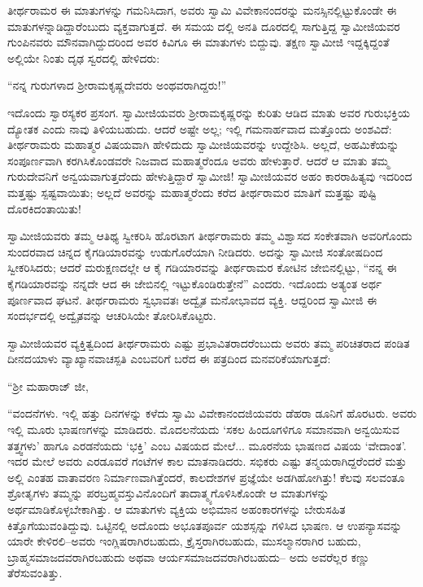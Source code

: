 ತೀರ್ಥರಾಮರ ಈ ಮಾತುಗಳನ್ನು ಗಮನಿಸಿದಾಗ, ಅವರು ಸ್ವಾಮಿ ವಿವೇಕಾನಂದರನ್ನು ಮನಸ್ಸಿನಲ್ಲಿಟ್ಟುಕೊಂಡೇ ಈ ಮಾತುಗಳನ್ನಾಡಿದ್ದಾರೆಂಬುದು ವ್ಯಕ್ತವಾಗುತ್ತದೆ. ಈ ಸಮಯ ದಲ್ಲಿ ಅನತಿ ದೂರದಲ್ಲಿ ಸಾಗುತ್ತಿದ್ದ ಸ್ವಾಮೀಜಿಯವರ ಗುಂಪಿನವರು ಮೌನವಾಗಿದ್ದುದರಿಂದ ಅವರ ಕಿವಿಗೂ ಈ ಮಾತುಗಳು ಬಿದ್ದುವು. ತಕ್ಷಣ ಸ್ವಾಮೀಜಿ ಇದ್ದಕ್ಕಿದ್ದಂತೆ ಅಲ್ಲಿಯೇ ನಿಂತು ದೃಢ ಸ್ವರದಲ್ಲಿ ಹೇಳಿದರು:

“ನನ್ನ ಗುರುಗಳಾದ ಶ್ರೀರಾಮಕೃಷ್ಣದೇವರು ಅಂಥವರಾಗಿದ್ದರು!”

ಇದೊಂದು ಸ್ವಾರಸ್ಯಕರ ಪ್ರಸಂಗ. ಸ್ವಾಮೀಜಿಯವರು ಶ್ರೀರಾಮಕೃಷ್ಣರನ್ನು ಕುರಿತು ಆಡಿದ ಮಾತು ಅವರ ಗುರುಭಕ್ತಿಯ ದ್ಯೋತಕ ಎಂದು ನಾವು ತಿಳಿಯಬಹುದು. ಆದರೆ ಅಷ್ಟೇ ಅಲ್ಲ; ಇಲ್ಲಿ ಗಮನಾರ್ಹವಾದ ಮತ್ತೊಂದು ಅಂಶವಿದೆ: ತೀರ್ಥರಾಮರು ಮಹಾತ್ಮರ ವಿಷಯವಾಗಿ ಹೇಳಿದುದು ಸ್ವಾಮೀಜಿಯವರನ್ನು ಉದ್ದೇಶಿಸಿ. ಅಲ್ಲದೆ, ಅಹಮಿಕೆಯನ್ನು ಸಂಪೂರ್ಣವಾಗಿ ಕರಗಿಸಿಕೊಂಡವರೇ ನಿಜವಾದ ಮಹಾತ್ಮರೆಂದೂ ಅವರು ಹೇಳುತ್ತಾರೆ. ಆದರೆ ಆ ಮಾತು ತಮ್ಮ ಗುರುದೇವನಿಗೆ ಅನ್ವಯವಾಗುತ್ತದೆಂದು ಹೇಳುತ್ತಿದ್ದಾರೆ ಸ್ವಾಮೀಜಿ! ಸ್ವಾಮೀಜಿಯವರ ಅಹಂ ಕಾರರಾಹಿತ್ಯವು ಇದರಿಂದ ಮತ್ತಷ್ಟು ಸ್ಪಷ್ಟವಾಯಿತು; ಅಲ್ಲದೆ ಅವರನ್ನು ಮಹಾತ್ಮರೆಂದು ಕರೆದ ತೀರ್ಥರಾಮರ ಮಾತಿಗೆ ಮತ್ತಷ್ಟು ಪುಷ್ಟಿ ದೊರಕಿದಂತಾಯಿತು!

ಸ್ವಾಮೀಜಿಯವರು ತಮ್ಮ ಆತಿಥ್ಯ ಸ್ವೀಕರಿಸಿ ಹೊರಟಾಗ ತೀರ್ಥರಾಮರು ತಮ್ಮ ವಿಶ್ವಾಸದ ಸಂಕೇತವಾಗಿ ಅವರಿಗೊಂದು ಸುಂದರವಾದ ಚಿನ್ನದ ಕೈಗಡಿಯಾರವನ್ನು ಉಡುಗೊರೆಯಾಗಿ ನೀಡಿದರು. ಅದನ್ನು ಸ್ವಾಮೀಜಿ ಸಂತೋಷದಿಂದ ಸ್ವೀಕರಿಸಿದರು; ಆದರೆ ಮರುಕ್ಷಣದಲ್ಲೇ ಆ ಕೈ ಗಡಿಯಾರವನ್ನು ತೀರ್ಥರಾಮರ ಕೋಟಿನ ಜೇಬಿನಲ್ಲಿಟ್ಟು, “ನನ್ನ ಈ ಕೈಗಡಿಯಾರವನ್ನು ನನ್ನದೇ ಆದ ಈ ಜೇಬಿನಲ್ಲಿ ಇಟ್ಟುಕೊಂಡಿರುತ್ತೇನೆ” ಎಂದರು. ಇದೊಂದು ಅತ್ಯಂತ ಅರ್ಥ ಪೂರ್ಣವಾದ ಘಟನೆ. ತೀರ್ಥರಾಮರು ಸ್ವಭಾವತಃ ಅದ್ವೈತ ಮನೋಭಾವದ ವ್ಯಕ್ತಿ. ಆದ್ದರಿಂದ ಸ್ವಾಮೀಜಿ ಈ ಸಂದರ್ಭದಲ್ಲಿ ಅದ್ವೈತವನ್ನು ಆಚರಿಸಿಯೇ ತೋರಿಸಿಕೊಟ್ಟರು.

ಸ್ವಾಮೀಜಿಯವರ ವ್ಯಕ್ತಿತ್ವದಿಂದ ತೀರ್ಥರಾಮರು ಎಷ್ಟು ಪ್ರಭಾವಿತರಾದರೆಂಬುದು ಅವರು ತಮ್ಮ ಪರಿಚಿತರಾದ ಪಂಡಿತ ದೀನದಯಾಳು ವ್ಯಾಖ್ಯಾನವಾಚಸ್ಪತಿ ಎಂಬವರಿಗೆ ಬರೆದ ಈ ಪತ್ರದಿಂದ ಮನವರಿಕೆಯಾಗುತ್ತದೆ:

\noindent

“ಶ್ರೀ ಮಹಾರಾಜ್ ಜೀ,

“ವಂದನೆಗಳು. ಇಲ್ಲಿ ಹತ್ತು ದಿನಗಳನ್ನು ಕಳೆದು ಸ್ವಾಮಿ ವಿವೇಕಾನಂದಜಿಯವರು ಡೆಹರಾ ಡೂನಿಗೆ ಹೊರಟರು. ಅವರು ಇಲ್ಲಿ ಮೂರು ಭಾಷಣಗಳನ್ನು ಮಾಡಿದರು. ಮೊದಲನೆಯದು ‘ಸಕಲ ಹಿಂದೂಗಳಿಗೂ ಸಮಾನವಾಗಿ ಅನ್ವಯಿಸುವ ತತ್ತ್ವಗಳು’ ಹಾಗೂ ಎರಡನೆಯದು ‘ಭಕ್ತಿ’ ಎಂಬ ವಿಷಯದ ಮೇಲೆ... ಮೂರನೆಯ ಭಾಷಣದ ವಿಷಯ ‘ವೇದಾಂತ’. ಇದರ ಮೇಲೆ ಅವರು ಎರಡೂವರೆ ಗಂಟೆಗಳ ಕಾಲ ಮಾತನಾಡಿದರು. ಸಭಿಕರು ಎಷ್ಟು ತನ್ಮಯರಾಗಿದ್ದರೆಂದರೆ ಮತ್ತು ಅಲ್ಲಿ ಎಂತಹ ವಾತಾವರಣ ನಿರ್ಮಾಣವಾಗಿತ್ತೆಂದರೆ, ಕಾಲದೇಶಗಳ ಪ್ರಜ್ಞೆಯೇ ಅಡಗಿಹೋಗಿತ್ತು! ಕೆಲವು ಸಲವಂತೂ ಶ್ರೋತೃಗಳು ತಮ್ಮನ್ನು ಪರಬ್ರಹ್ಮವಸ್ತುವಿನೊಂದಿಗೆ ತಾದಾತ್ಮ್ಯಗೊಳಿಸಿಕೊಂಡೇ ಆ ಮಾತುಗಳನ್ನು ಅರ್ಥಮಾಡಿಕೊಳ್ಳಬೇಕಾಗಿತ್ತು. ಆ ಮಾತುಗಳು ವ್ಯಕ್ತಿಯ ಅಭಿಮಾನ ಅಹಂಕಾರಗಳನ್ನು ಬೇರುಸಹಿತ ಕಿತ್ತೊಗೆಯುವಂತಿದ್ದುವು. ಒಟ್ಟಿನಲ್ಲಿ ಅದೊಂದು ಅಭೂತಪೂರ್ವ ಯಶಸ್ಸನ್ನು ಗಳಿಸಿದ ಭಾಷಣ. ಆ ಉಪನ್ಯಾಸವನ್ನು ಯಾರೇ ಕೇಳಿರಲಿ–ಅವರು ಇಂಗ್ಲಿಷರಾಗಿರಬಹುದು, ಕ್ರೈಸ್ತರಾಗಿರಬಹುದು, ಮುಸಲ್ಮಾನರಾಗಿರ ಬಹುದು, ಬ್ರಾಹ್ಮಸಮಾಜದವರಾಗಿರಬಹುದು ಅಥವಾ ಆರ್ಯಸಮಾಜದವರಾಗಿರಬಹುದು– ಅದು ಅವರೆಲ್ಲರ ಕಣ್ಣು ತೆರೆಸುವಂತಿತ್ತು.

